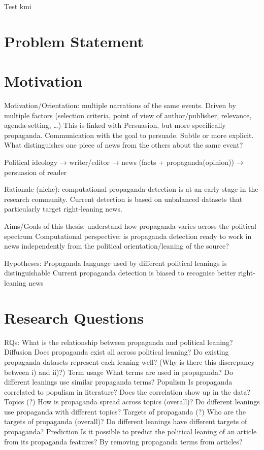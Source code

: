 Test
\acrshort{kmi}

\section{Problem Statement}

\section{Motivation}

Motivation/Orientation: multiple narrations of the same events. Driven by multiple factors (selection criteria, point of view of author/publisher, relevance, agenda-setting, …)
This is linked with Persuasion, but more specifically propaganda. Communication with the goal to persuade. Subtle or more explicit.
What distinguishes one piece of news from the others about the same event? 

Political ideology → writer/editor → news (facts + propaganda(opinion)) → persuasion of reader

Rationale (niche): computational propaganda detection is at an early stage in the research community. Current detection is based on unbalanced datasets that particularly target right-leaning news.

Aims/Goals of this thesis: 
understand how propaganda varies across the political spectrum
Computational perspective: is propaganda detection ready to work in news independently from the political orientation/leaning of the source?

Hypotheses:
Propaganda language used by different political leanings is distinguishable
 Current propaganda detection is biased to recognise better right-leaning news


\section{Research Questions}

RQs:
What is the relationship between propaganda and political leaning?
Diffusion
Does propaganda exist all across political leaning?
Do existing propaganda datasets represent each leaning well?
(Why is there this discrepancy between i) and ii)?)
Term usage
What terms are used in propaganda?
Do different leanings use similar propaganda terms?
Populism
Is propaganda correlated to populism in literature?
Does the correlation show up in the data?
Topics (?)
How is propaganda spread across topics (overall)?
Do different leanings use propaganda with different topics?
Targets of propaganda (?)
Who are the targets of propaganda (overall)?
Do different leanings have different targets of propaganda?
Prediction
Is it possible to predict the political leaning of an article from its propaganda features?
By removing propaganda terms from articles? 


